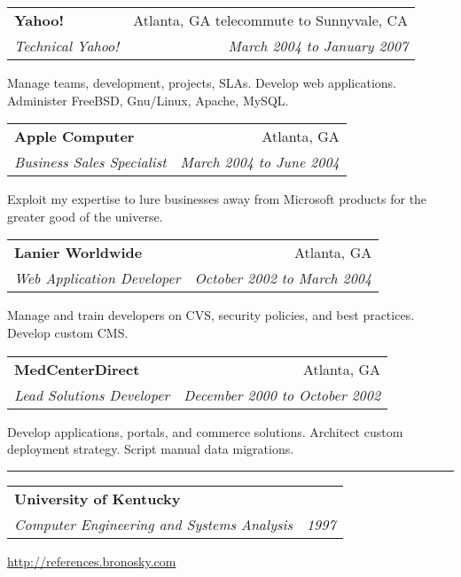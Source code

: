 \documentclass[10pt]{article}
\makeatletter
\newcounter{blocktitlechildren}
\newcommand{\blocktitle}[1]{
    \blocktitlechild{2mm}
    \setcounter{blocktitlechildren}{0}
    {{\sc{#1}\vspace{1.5mm}\hrule}\vspace*{1.5mm}}
}
\newcommand{\blocktitlechild}[2][]{
    \ifthenelse{\equal{\value{blocktitlechildren}}{0}}{}{\vspace{#2}#1}
    \addtocounter{blocktitlechildren}{1}
}
\newcommand{\sectionheader}[4]{
    \blocktitlechild{2mm}
    \begin{tabular*}{\textwidth}{l@{\extracolsep{\fill}}r}
    \textbf{#1} & #2\\
    \emph{#3} & \emph{#4}
    \end{tabular*}
}
\newenvironment{longtext}[1]{\small {#1}}
\makeatother
\begin{document}
\sectionheader
{Yahoo!}{Atlanta, GA telecommute to Sunnyvale, CA}
{Technical Yahoo!}
{March 2004 to January 2007}
\begin{longtext}
Manage teams, development, projects, SLAs.
Develop web applications.
Administer FreeBSD, Gnu/Linux, Apache, MySQL.
\end{longtext}

\sectionheader
{Apple Computer}{Atlanta, GA}
{Business Sales Specialist}
{March 2004 to June 2004}
\begin{longtext}
Exploit my expertise to lure businesses away from Microsoft products for the greater good of the universe.
\end{longtext}

\sectionheader
{Lanier Worldwide}{Atlanta, GA}
{Web Application Developer}
{October 2002 to March 2004}
\begin{longtext}
Manage and train developers on CVS, security policies, and best practices.
Develop custom CMS.
\end{longtext}

\sectionheader
{MedCenterDirect}{Atlanta, GA}
{Lead Solutions Developer}
{December 2000 to October 2002}
\begin{longtext}
Develop applications, portals, and commerce solutions.
Architect custom deployment strategy.
Script manual data migrations.
\end{longtext}

\blocktitle{Education}

\sectionheader
{University of Kentucky}{}
{Computer Engineering and Systems Analysis}
{1997}
\hspace*{\fill}
\vspace{1mm}
\href{http://references.bronosky.com}{http://references.bronosky.com}
\end{document}
